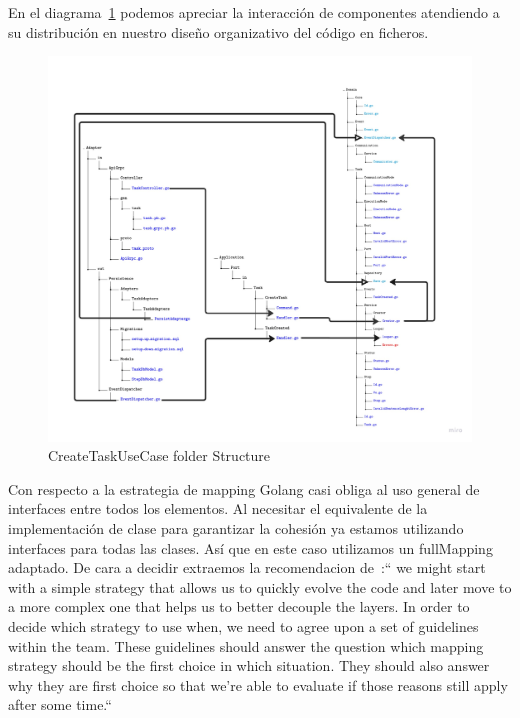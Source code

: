 En el diagrama~\cref{fig:createTaskUseCaseArchitectureFolderStructure} podemos apreciar la interacción de componentes atendiendo a su distribución en nuestro diseño organizativo del código en ficheros.

\begin{figure}[H]
    \centering
    \includegraphics[height=0.5\textheight]{./part/Ejecucion/Seguimiento/CreateTaskUseCase/img/PFM - CreateUseCaseFolderStructure}
    \caption{CreateTaskUseCase folder Structure}\label{fig:createTaskUseCaseArchitectureFolderStructure}
\end{figure}

Con respecto a la estrategia de mapping Golang casi obliga al uso general de interfaces entre todos los elementos.
Al necesitar el equivalente de la implementación de clase para garantizar la cohesión ya estamos utilizando interfaces para todas las clases.
Así que en este caso utilizamos un fullMapping adaptado.
De cara a decidir extraemos la recomendacion de~\cite{TomHombergs2019GYHD}:“
we might start with a simple strategy that allows us to quickly evolve the code and later move to a more complex one that helps us to better decouple the layers.
In order to decide which strategy to use when, we need to agree upon a set of guidelines within the team.
These guidelines should answer the question which mapping strategy should be the first choice in which situation.
They should also answer why they are first choice so that we’re able to evaluate if those reasons still apply after some time.“

